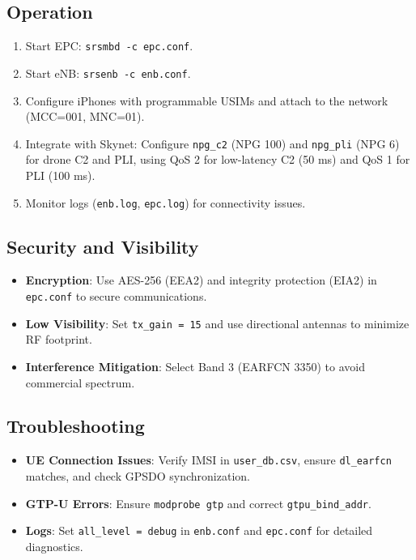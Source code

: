 \documentclass{article}
\begin{document}
\subsection{Operation}
\begin{enumerate}
\item Start EPC: \texttt{srsmbd -c epc.conf}.
\item Start eNB: \texttt{srsenb -c enb.conf}.
\item Configure iPhones with programmable USIMs and attach to the network (MCC=001, MNC=01).
\item Integrate with Skynet:
       Configure \texttt{npg\_c2} (NPG 100) and
                \texttt{npg\_pli} (NPG 6) for drone C2 and PLI,
                             using QoS 2 for low-latency C2 (50 ms)
                               and QoS 1 for PLI (100 ms).
\item Monitor logs (\texttt{enb.log}, \texttt{epc.log}) for connectivity issues.
\end{enumerate}

\subsection{Security and Visibility}
\begin{itemize}
\item \textbf{Encryption}: Use AES-256 (EEA2) and integrity protection (EIA2) in \texttt{epc.conf} to secure communications.
\item \textbf{Low Visibility}: Set \texttt{tx\_gain = 15} and use directional antennas to minimize RF footprint.
\item \textbf{Interference Mitigation}: Select Band 3 (EARFCN 3350) to avoid commercial spectrum.
\end{itemize}

\subsection{Troubleshooting}
\begin{itemize}
\item \textbf{UE Connection Issues}: Verify IMSI in \texttt{user\_db.csv}, ensure \texttt{dl\_earfcn} matches, and check GPSDO synchronization.
\item \textbf{GTP-U Errors}: Ensure \texttt{modprobe gtp} and correct \texttt{gtpu\_bind\_addr}.
\item \textbf{Logs}: Set \texttt{all\_level = debug} in \texttt{enb.conf} and \texttt{epc.conf} for detailed diagnostics.
\end{itemize}
\end{document}
